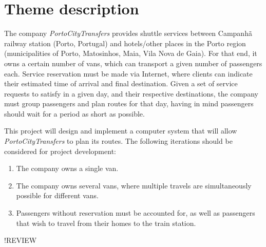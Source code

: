 \chapter{Theme description} \label{theme-description}
The company \emph{PortoCityTransfers} provides shuttle services between Campanhã railway station (Porto, Portugal) and hotels/other places in the Porto region (municipalities of Porto, Matosinhos, Maia, Vila Nova de Gaia). For that end, it owns a certain number of vans, which can transport a given number of passengers each. Service reservation must be made via Internet, where clients can indicate their estimated time of arrival and final destination. Given a set of service requests to satisfy in a given day, and their respective destinations, the company must group passengers and plan routes for that day, having in mind passengers should wait for a period as short as possible.\par
This project will design and implement a computer system that will allow \emph{PortoCityTransfers} to plan its routes. The following iterations should be considered for project development:
\begin{enumerate}
    \item The company owns a single van.
    \item The company owns several vans, where multiple travels are simultaneously possible for different vans.
    \item Passengers without reservation must be accounted for, as well as passengers that wish to travel from their homes to the train station.
\end{enumerate}
!REVIEW
